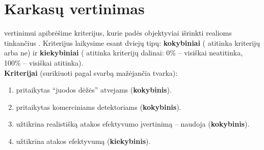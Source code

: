 \section{Karkasų vertinimas}\label{sec:criteria}

 vertinimui apibrėšime kriterijus, kurie padės objektyviai išrinkti
realioms  tinkančius . Kriterijus
laikysime esant dviejų tipų: \textbf{kokybiniai} ( atitinka
kriterijų arba ne) ir \textbf{kiekybiniai} ( atitinka
kriterijų dalinai: 0\% -- visiškai neatitinka, 100\% -- visiškai atitinka). \\

\textbf{Kriterijai} (surikiuoti pagal svarbą mažėjančia tvarka):
\vspace{-5pt}
\begin{enumerate}[label=K-\arabic*., ref=K-\arabic*]
    \item {} pritaikytas \enquote{juodos dėžės} atvejams (\textbf{kokybinis}).\label{enum:criteria:blackbox}
    \item {} pritaikytas komerciniams detektoriams (\textbf{kokybinis}).\label{enum:criteria:commercial}
    \item {} užtikrina realistišką atakos efektyvumo įvertinimą -- naudoja  (\textbf{kokybinis}).\label{enum:criteria:surrogate}
    \item {} užtikrina atakos efektyvumą (\textbf{kiekybinis}).\label{enum:criteria:effective}
\end{enumerate}

\newenvironment{criteriaTable}{
    \newcommand{\rowLast}[1]{##1}
    \newcommand{\row}[1]{##1 \\}
    \newcommand{\tbl}[1]{\gdef\Table{##1}}

    \def\Table{}
}{
    \begin{table}[h]
        \centering
        \begin{tabular}{|l|c|c|c|S|}
            \row{
            \textbf{\Glsshort{framework}}           &
            \textbf{\ref{enum:criteria:blackbox}}   &
            \textbf{\ref{enum:criteria:commercial}} &
            \textbf{\ref{enum:criteria:surrogate}}  &
                \textbf{\ref{enum:criteria:effective}}
            } \midrule
            \Table{}
        \end{tabular}
        \caption{\Glsplwhom{framework} vertinimas pagal kriterijus. \Glspl{framework} surikiuoti pagal įvertinimą mažėjančia tvarka.}\label{tab:criteria}
    \end{table}
}

